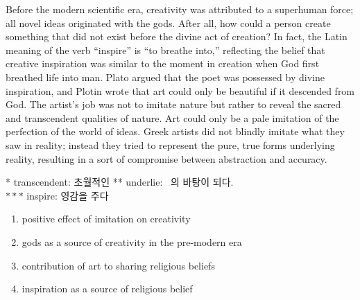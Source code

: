 \documentclass[9pt, a4paper, twocolumn]{oblivoir}
\begin{document}
\begin{enumerate}
        Before the modern scientific era, creativity was attributed
to a superhuman force; all novel ideas originated with the
gods. After all, how could a person create something that
did not exist before the divine act of creation? In fact, the
Latin meaning of the verb “inspire” is “to breathe into,”
reflecting the belief that creative inspiration was similar to
the moment in creation when God first breathed life into
man. Plato argued that the poet was possessed by divine
inspiration, and Plotin wrote that art could only be beautiful
if it descended from God. The artist's job was not to imitate
nature but rather to reveal the sacred and transcendent
qualities of nature. Art could only be a pale imitation of the
perfection of the world of ideas. Greek artists did not
blindly imitate what they saw in reality; instead they tried
to represent the pure, true forms underlying reality,
resulting in a sort of compromise between abstraction and
accuracy.
\begin{flushright}
    \small{* transcendent: 초월적인 ** underlie: ~의 바탕이 되다.\\ $***$ inspire: 영감을 주다}
\end{flushright}
        \begin{enumerate}
            \item positive effect of imitation on creativity
            \item gods as a source of creativity in the pre-modern era %
            \item contribution of art to sharing religious beliefs
            \item inspiration as a source of religious belief 
        \end{enumerate}
    \end{enumerate}
\end{document}
